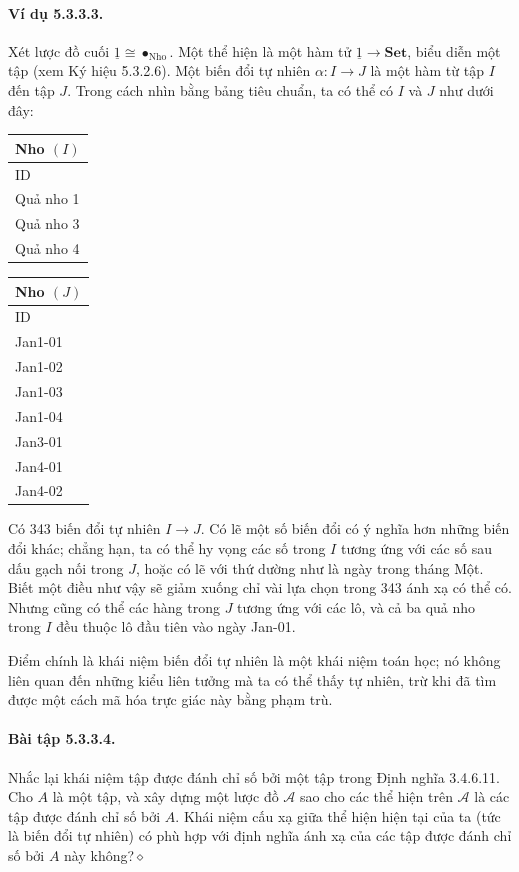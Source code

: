 \paragraph{Ví dụ 5.3.3.3.} Xét lược đồ cuối $\underline{1}\cong\bullet_{\text{Nho}}$. Một thể hiện là một hàm tử $\underline{1}\to\mathbf{Set}$, biểu diễn một tập (xem Ký hiệu 5.3.2.6). Một biến đổi tự nhiên $\alpha:I\to J$ là một hàm từ tập $I$ đến tập $J$. Trong cách nhìn bằng bảng tiêu chuẩn, ta có thể có $I$ và $J$ như dưới đây:
\begin{center}\begin{tabular}{|l|}\hline Nho $(I)$\\\hline ID\\\hline Quả nho 1\\Quả nho 3\\Quả nho 4\\\hline\end{tabular}\qquad\begin{tabular}{|l|}\hline Nho $(J)$\\\hline ID\\\hline Jan1-01\\Jan1-02\\Jan1-03\\Jan1-04\\Jan3-01\\Jan4-01\\Jan4-02\\\hline\end{tabular}\end{center}
Có 343 biến đổi tự nhiên $I\to J$. Có lẽ một số biến đổi có ý nghĩa hơn những biến đổi khác; chẳng hạn, ta có thể hy vọng các số trong $I$ tương ứng với các số sau dấu gạch nối trong $J$, hoặc có lẽ với thứ dường như là ngày trong tháng Một. Biết một điều như vậy sẽ giảm xuống chỉ vài lựa chọn trong 343 ánh xạ có thể có. Nhưng cũng có thể các hàng trong $J$ tương ứng với các lô, và cả ba quả nho trong $I$ đều thuộc lô đầu tiên vào ngày Jan-01.

Điểm chính là khái niệm biến đổi tự nhiên là một khái niệm toán học; nó không liên quan đến những kiểu liên tưởng mà ta có thể thấy tự nhiên, trừ khi đã tìm được một cách mã hóa trực giác này bằng phạm trù.
\paragraph{Bài tập 5.3.3.4.} Nhắc lại khái niệm tập được đánh chỉ số bởi một tập trong Định nghĩa 3.4.6.11. Cho $A$ là một tập, và xây dựng một lược đồ $\mathcal A$ sao cho các thể hiện trên $\mathcal A$ là các tập được đánh chỉ số bởi $A$. Khái niệm cấu xạ giữa thể hiện hiện tại của ta (tức là biến đổi tự nhiên) có phù hợp với định nghĩa ánh xạ của các tập được đánh chỉ số bởi $A$ này không?\hfill$\diamond$
